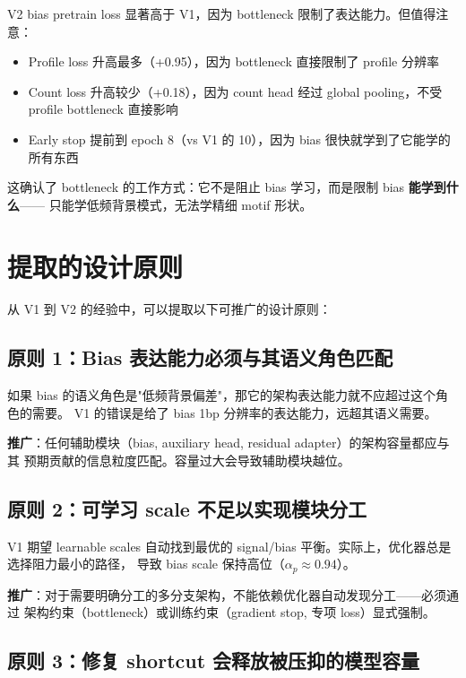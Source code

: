 \documentclass[11pt,a4paper]{ctexart}
\begin{document}
V2 bias pretrain loss 显著高于 V1，因为 bottleneck 限制了表达能力。但值得注意：
\begin{itemize}[leftmargin=2em]
  \item Profile loss 升高最多（+0.95），因为 bottleneck 直接限制了 profile 分辨率
  \item Count loss 升高较少（+0.18），因为 count head 经过 global pooling，不受 profile bottleneck 直接影响
  \item Early stop 提前到 epoch 8（vs V1 的 10），因为 bias 很快就学到了它能学的所有东西
\end{itemize}

这确认了 bottleneck 的工作方式：它不是阻止 bias 学习，而是限制 bias \textbf{能学到什么}——
只能学低频背景模式，无法学精细 motif 形状。

\section{提取的设计原则}

从 V1 到 V2 的经验中，可以提取以下可推广的设计原则：

\subsection{原则 1：Bias 表达能力必须与其语义角色匹配}

如果 bias 的语义角色是"低频背景偏差"，那它的架构表达能力就不应超过这个角色的需要。
V1 的错误是给了 bias 1bp 分辨率的表达能力，远超其语义需要。

\textbf{推广}：任何辅助模块（bias, auxiliary head, residual adapter）的架构容量都应与其
预期贡献的信息粒度匹配。容量过大会导致辅助模块越位。

\subsection{原则 2：可学习 scale 不足以实现模块分工}

V1 期望 learnable scales 自动找到最优的 signal/bias 平衡。实际上，优化器总是选择阻力最小的路径，
导致 bias scale 保持高位（$\alpha_p \approx 0.94$）。

\textbf{推广}：对于需要明确分工的多分支架构，不能依赖优化器自动发现分工——必须通过
架构约束（bottleneck）或训练约束（gradient stop, 专项 loss）显式强制。

\subsection{原则 3：修复 shortcut 会释放被压抑的模型容量}
\end{document}
